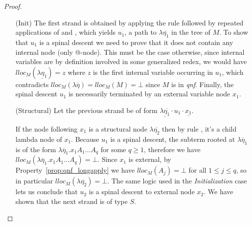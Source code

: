 \documentclass{article}
\theoremstyle{definition}
\begin{document}
\begin{proof}
\begin{enumerate}
\item[(Init)] The first strand is obtained by applying the rule  followed by repeated applications of  and , which yields $u_1$, a path to $\lambda\overline{\eta_1}$ in the tree of $M$. To show that $u_1$ is a spinal descent we need to prove that it does not contain any internal node (only @-node). This must be the case otherwise, since internal variables are by definition involved in some generalized redex, we would have $lloc_M(\underline{\lambda\eta_1}) = z$ where $z$ is the first internal variable occurring in $u_1$, which contradicts $lloc_M(\lambda \overline{\eta}) = lloc_M(M) = \bot$ since $M$ is in \emph{qnf}. Finally, the spinal descent $u_1$ is necessarily terminated by an external variable node $x_1$.

\item[(Structural)] Let the previous strand be of form $\underline{\lambda\overline{\eta_1}} \cdot u_1 \cdot \underline{x_1} $.

If the node following $x_1$ is a structural node $\lambda\overline{\eta_2}$ then by rule , it's a child lambda node of $x_1$.
Because $u_1$ is a spinal descent, the subterm rooted at $\lambda \overline\eta_1$ is of the form $\lambda \overline\eta_1 . x_1 A_1 \ldots A_q$ for some $q\geq1$, therefore we have $lloc_M(\lambda \overline\eta_1 . x_1 A_1 \ldots A_q) = \bot$. Since $x_1$ is external, by Property~\ref{prop:qnf_longapply} we have $lloc_M(A_j)=\bot$ for all $1\leq j\leq q$, so in particular $lloc_M(\lambda\overline{\eta_2}) = \bot$. The same logic used in the \emph{Initialization} case lets us conclude that $u_2$ is a spinal descent to external node $x_2$. We have shown that the next strand is of type $S$.
\\


\end{enumerate}
\end{proof}
\end{document}
